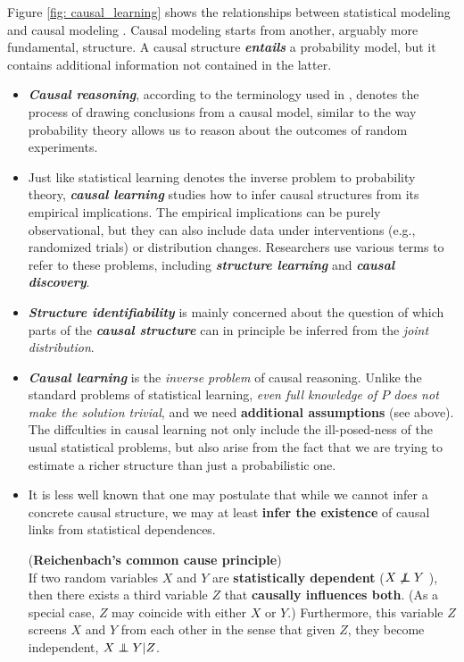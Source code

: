 \documentclass[11pt]{article}
\begin{document}
Figure \ref{fig: causal_learning} shows the relationships between statistical modeling and causal modeling \citep{peters2017elements}. Causal modeling starts from another, arguably more fundamental, structure. A causal structure \emph{\textbf{entails}} a probability model, but it contains additional information not contained in the latter.
\begin{itemize}
\item \textbf{\emph{Causal reasoning}}, according to the terminology used in \citep{peters2017elements}, denotes the process of drawing conclusions from a causal model, similar to the way probability theory allows us to reason about the outcomes of random experiments.


\item Just like statistical learning denotes the inverse problem to probability theory, \textbf{\emph{causal learning}} studies how to infer causal structures from its empirical implications.  The empirical implications can be purely observational, but they can also include data under interventions (e.g., randomized trials) or distribution changes. Researchers use various terms to refer to these problems, including \emph{\textbf{structure learning}} and \emph{\textbf{causal discovery}}.

\item \textbf{\emph{Structure identifiability}} is mainly concerned about the question of which parts of the \emph{\textbf{causal structure}} can in principle be inferred from the \emph{joint distribution}.

\item  \textbf{\emph{Causal learning}} is the \emph{inverse problem} of causal reasoning. Unlike the standard problems of statistical learning, \emph{even full knowledge of $P$ does not make the solution trivial}, and we need \textbf{additional assumptions} (see above). The diffculties in causal learning  not only include the  ill-posed-ness of the usual statistical problems, but also arise from the fact that we are trying to estimate a richer structure than just a probabilistic one.

\item It is less well known that one may postulate that while we cannot infer a concrete causal structure, we may at least \textbf{infer the existence} of causal links from statistical dependences. 
\begin{proposition}(\textbf{Reichenbach's common cause principle}) \citep{peters2017elements}\\
 If two random variables $X$ and $Y$ are \textbf{statistically dependent} ($X \not\indep Y$ ), then there exists a third variable $Z$ that \textbf{causally influences both}. (As a special case, $Z$ may coincide with either $X$ or $Y$.) Furthermore, this variable $Z$ screens $X$ and $Y$ from each other in the sense that given $Z$, they become independent,  $X \indep Y | Z$.
\end{proposition}
\end{itemize}

\newpage


\end{document}
